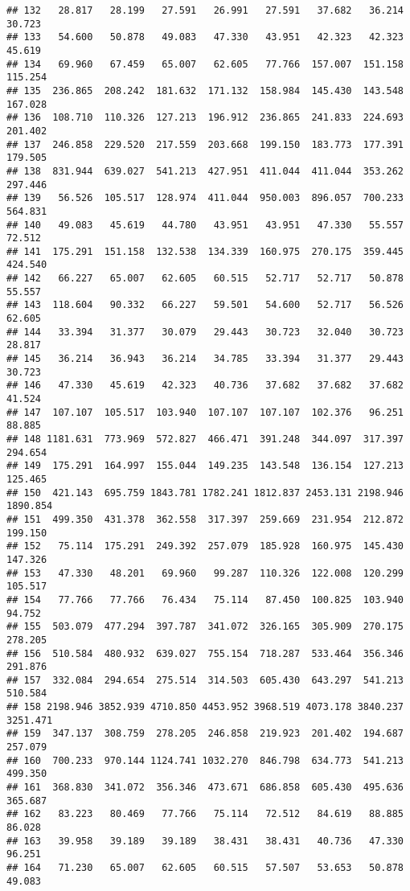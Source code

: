 \documentclass[
]{article}
\begin{document}
\begin{verbatim}
## 132   28.817   28.199   27.591   26.991   27.591   37.682   36.214   30.723
## 133   54.600   50.878   49.083   47.330   43.951   42.323   42.323   45.619
## 134   69.960   67.459   65.007   62.605   77.766  157.007  151.158  115.254
## 135  236.865  208.242  181.632  171.132  158.984  145.430  143.548  167.028
## 136  108.710  110.326  127.213  196.912  236.865  241.833  224.693  201.402
## 137  246.858  229.520  217.559  203.668  199.150  183.773  177.391  179.505
## 138  831.944  639.027  541.213  427.951  411.044  411.044  353.262  297.446
## 139   56.526  105.517  128.974  411.044  950.003  896.057  700.233  564.831
## 140   49.083   45.619   44.780   43.951   43.951   47.330   55.557   72.512
## 141  175.291  151.158  132.538  134.339  160.975  270.175  359.445  424.540
## 142   66.227   65.007   62.605   60.515   52.717   52.717   50.878   55.557
## 143  118.604   90.332   66.227   59.501   54.600   52.717   56.526   62.605
## 144   33.394   31.377   30.079   29.443   30.723   32.040   30.723   28.817
## 145   36.214   36.943   36.214   34.785   33.394   31.377   29.443   30.723
## 146   47.330   45.619   42.323   40.736   37.682   37.682   37.682   41.524
## 147  107.107  105.517  103.940  107.107  107.107  102.376   96.251   88.885
## 148 1181.631  773.969  572.827  466.471  391.248  344.097  317.397  294.654
## 149  175.291  164.997  155.044  149.235  143.548  136.154  127.213  125.465
## 150  421.143  695.759 1843.781 1782.241 1812.837 2453.131 2198.946 1890.854
## 151  499.350  431.378  362.558  317.397  259.669  231.954  212.872  199.150
## 152   75.114  175.291  249.392  257.079  185.928  160.975  145.430  147.326
## 153   47.330   48.201   69.960   99.287  110.326  122.008  120.299  105.517
## 154   77.766   77.766   76.434   75.114   87.450  100.825  103.940   94.752
## 155  503.079  477.294  397.787  341.072  326.165  305.909  270.175  278.205
## 156  510.584  480.932  639.027  755.154  718.287  533.464  356.346  291.876
## 157  332.084  294.654  275.514  314.503  605.430  643.297  541.213  510.584
## 158 2198.946 3852.939 4710.850 4453.952 3968.519 4073.178 3840.237 3251.471
## 159  347.137  308.759  278.205  246.858  219.923  201.402  194.687  257.079
## 160  700.233  970.144 1124.741 1032.270  846.798  634.773  541.213  499.350
## 161  368.830  341.072  356.346  473.671  686.858  605.430  495.636  365.687
## 162   83.223   80.469   77.766   75.114   72.512   84.619   88.885   86.028
## 163   39.958   39.189   39.189   38.431   38.431   40.736   47.330   96.251
## 164   71.230   65.007   62.605   60.515   57.507   53.653   50.878   49.083

\end{verbatim}
\end{document}
